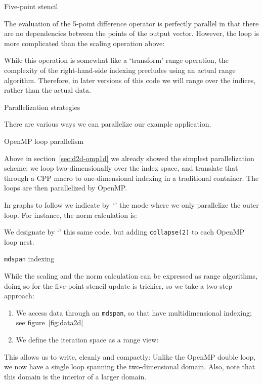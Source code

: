  {Five-point stencil}
\label{sec:d2d-5pt}

The evaluation of the 5-point difference operator is perfectly parallel
in that there are no dependencies between the points of the output vector.
However, the loop is more complicated than the scaling operation above:
%

While this operation is somewhat like a `transform' range operation,
the complexity of the right-hand-side indexing precludes using
an actual range algorithm.
Therefore, in later versions of this code we will range over
the indices, rather than the actual data.


 {Parallelization strategies}

There are various ways we can parallelize our example application.

 {OpenMP loop parallelism}

Above in section~\ref{sec:d2d-omp1d}
we already showed the simplest parallelization scheme:
we loop two-dimensionally over the index space,
and translate that through a \ac{CPP} macro
to one-dimensional indexing in a traditional container.
The loops are then parallelized by OpenMP.

In graphs to follow we indicate by~`'
the mode where we only parallelize the outer loop.
For instance, the norm calculation is:
%

We designate by `' this same code, but adding
\lstinline[language=omp]{collapse(2)} to each OpenMP loop nest.

 {\texttt{mdspan} indexing}

While the scaling and the norm calculation can be expressed as range algorithms,
doing so for the five-point stencil update is trickier,
so we take a two-step approach:

  
\begin{enumerate}
\item We access data through an \lstinline{mdspan}, so that have multidimensional indexing;
  see figure~\ref{fig:data2d}

\begin{figure*}[h]
  \caption{Use of \texttt{mdspan} for 2D data access}
  \label{fig:data2d}
\end{figure*}

\item We define the iteration space as a  range view:


\end{enumerate}
This allows us to write, cleanly and compactly:
%
%
Unlike the OpenMP double loop, we now have a single loop
spanning the two-dimensional domain.
Also, note that this domain is the interior of a larger domain.

